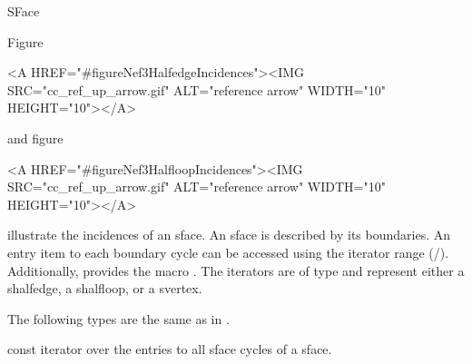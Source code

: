 
\ccRefPageBegin



\begin{ccRefClass}{SFace}

\ccDefinition

Figure~\begin{ccHtmlOnly}
  <A HREF="#figureNef3HalfedgeIncidences"><IMG 
  SRC="cc_ref_up_arrow.gif" ALT="reference arrow" WIDTH="10" HEIGHT="10"></A>
\end{ccHtmlOnly} and
figure~\begin{ccHtmlOnly}
  <A HREF="#figureNef3HalfloopIncidences"><IMG 
  SRC="cc_ref_up_arrow.gif" ALT="reference arrow" WIDTH="10" HEIGHT="10"></A>
\end{ccHtmlOnly} illustrate the incidences of an sface. An sface is described
by its boundaries. An entry item to each boundary cycle can be accessed
using the iterator range (/).
Additionally,  provides the macro 
. The iterators are of type 
 and represent either a shalfedge, a shalfloop,
or a svertex.



\ccTypes
{}
\ccThreeToTwo

The following types are the same as in .



\ccGlue
{}
\ccGlue
{}
\ccGlue
{}
{const iterator over the entries to all sface cycles of a sface.}


\end{ccRefClass}

